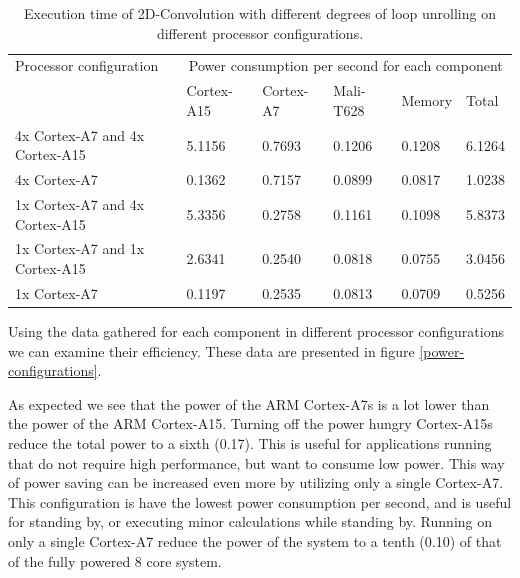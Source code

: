 \begin{table}[H]
  \begin{tabular}{llllll}
    \toprule
    Processor configuration         & \multicolumn{5}{c}{Power consumption per second for each component} \\
                                    & Cortex-A15  & Cortex-A7 & Mali-T628 & Memory  & Total \\
    \midrule
    4x Cortex-A7 and 4x Cortex-A15  & 5.1156          & 0.7693        & 0.1206        & 0.1208  & 6.1264 \\
    4x Cortex-A7                    & 0.1362          & 0.7157        & 0.0899        & 0.0817  & 1.0238 \\
    1x Cortex-A7 and 4x Cortex-A15  & 5.3356          & 0.2758        & 0.1161        & 0.1098  & 5.8373 \\
    1x Cortex-A7 and 1x Cortex-A15  & 2.6341          & 0.2540        & 0.0818        & 0.0755  & 3.0456 \\
    1x Cortex-A7                    & 0.1197          & 0.2535        & 0.0813        & 0.0709  & 0.5256 \\
    \bottomrule
  \end{tabular}
  \caption{Execution time of 2D-Convolution with different degrees of loop unrolling on different processor configurations. \label{overflow}}
\end{table}
Using the data gathered for each component in different processor configurations we can examine their efficiency.
These data are presented in figure \ref{power-configurations}.

As expected we see that the power of the ARM Cortex-A7s is a lot lower than the power of the ARM Cortex-A15.
Turning off the power hungry Cortex-A15s reduce the total power to a sixth (0.17).
This is useful for applications running that do not require high performance, but want to consume low power.
This way of power saving can be increased even more by utilizing only a single Cortex-A7.
This configuration is have the lowest power consumption per second, and is useful for standing by, or executing minor calculations while standing by.
Running on only a single Cortex-A7 reduce the power of the system to a tenth (0.10) of that of the fully powered 8 core system.

